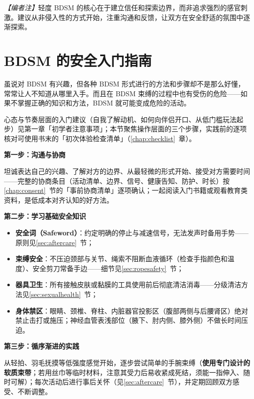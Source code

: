 \documentclass[12pt,UTF8]{ctexbook}
\begin{document}
\textit{【编者注】}轻度 BDSM 的核心在于建立信任和探索边界，而非追求强烈的感官刺激。建议从非侵入性的方式开始，注重沟通和反馈，让双方在安全舒适的氛围中逐渐探索。

\section{BDSM 的安全入门指南}

虽说对 BDSM 有兴趣，但各种 BDSM 形式进行的方法和步骤却不是那么好懂，常常让人不知道从哪里入手。而且在 BDSM 束缚的过程中也有受伤的危险——如果不掌握正确的知识和方法，BDSM 就可能变成危险的活动。

心态与节奏层面的入门建议（自我了解动机、如何向伴侣开口、从低门槛玩法起步）见第一章「初学者注意事项」；本节聚焦操作层面的三个步骤，实践前的逐项核对可使用书末的「初次体验检查清单」（\ref{chap:checklist}~章）。

\noindent\textbf{第一步：沟通与协商}

坦诚表达自己的兴趣、了解对方的边界、从最轻微的形式开始、接受对方需要时间——完整的协商条目（活动清单、边界、信号、健康告知、防护、时长）按\ref{chap:consent}~节的「事前协商清单」逐项确认；一起阅读入门书籍或观看教育类资料，是低成本对齐认知的好方法。

\noindent\textbf{第二步：学习基础安全知识}

\begin{itemize}
	\item \textbf{安全词（Safeword）}：约定明确的停止与减速信号，无法发声时备用手势——原则见\ref{sec:aftercare}~节；
	\item \textbf{束缚安全}：不压迫颈部与关节、绳索不阻断血液循环（检查手指颜色和温度）、安全剪刀常备手边——细节见\ref{sec:ropesafety}~节；
	\item \textbf{器具卫生}：所有接触皮肤或黏膜的工具使用前后彻底清洁消毒——分级清洁方法见\ref{sec:sexualhealth}~节；
	\item \textbf{身体禁区}：眼睛、颈椎、脊柱、内脏器官投影区（腹部两侧与后腰肾区）绝对禁止击打或施压；神经血管表浅部位（腋下、肘内侧、膝外侧）不做长时间压迫。
\end{itemize}

\noindent\textbf{第三步：循序渐进的实践}

从轻拍、羽毛抚摸等低强度感觉开始，逐步尝试简单的手腕束缚（\textbf{使用专门设计的软质束带}；若用丝巾等临时材料，注意其受力后易收紧成死结，须能一指伸入、随时可解）；每次活动后进行事后关怀（见\ref{sec:aftercare}~节），并定期回顾双方感受、不断调整。
\end{document}
